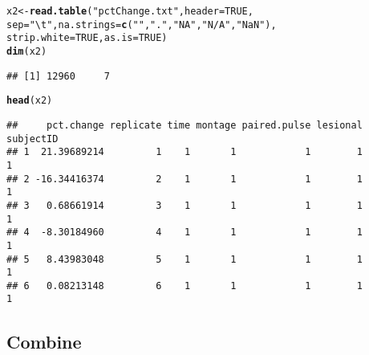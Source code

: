 \documentclass[11pt]{article}\usepackage[]{graphicx}\usepackage[]{color}
\makeatletter
\newcommand{\hlnum}[1]{\textcolor[rgb]{0.686,0.059,0.569}{#1}}%
\newcommand{\hlstr}[1]{\textcolor[rgb]{0.192,0.494,0.8}{#1}}%
\newcommand{\hlstd}[1]{\textcolor[rgb]{0.345,0.345,0.345}{#1}}%
\newcommand{\hlkwb}[1]{\textcolor[rgb]{0.69,0.353,0.396}{#1}}%
\newcommand{\hlkwc}[1]{\textcolor[rgb]{0.333,0.667,0.333}{#1}}%
\newcommand{\hlkwd}[1]{\textcolor[rgb]{0.737,0.353,0.396}{\textbf{#1}}}%
\newenvironment{kframe}{%
 \def\at@end@of@kframe{}%
 \ifinner\ifhmode%
  \def\at@end@of@kframe{\end{minipage}}%
  \begin{minipage}{\columnwidth}%
 \fi\fi%
 \def\FrameCommand##1{\hskip\@totalleftmargin \hskip-\fboxsep
 \colorbox{shadecolor}{##1}\hskip-\fboxsep
     \hskip-\linewidth \hskip-\@totalleftmargin \hskip\columnwidth}%
 \MakeFramed {\advance\hsize-\width
   \@totalleftmargin\z@ \linewidth\hsize
   \@setminipage}}%
 {\par\unskip\endMakeFramed%
 \at@end@of@kframe}
\newenvironment{knitrout}{}{} %
\makeatother
\begin{document}
\begin{knitrout}
\color{fgcolor}\begin{kframe}
\begin{alltt}
\hlstd{x2}\hlkwb{<-}\hlkwd{read.table}\hlstd{(}\hlstr{"pctChange.txt"}\hlstd{,}\hlkwc{header}\hlstd{=}\hlnum{TRUE}\hlstd{,}
                \hlkwc{sep}\hlstd{=}\hlstr{"\textbackslash{}t"}\hlstd{,}\hlkwc{na.strings}\hlstd{=}\hlkwd{c}\hlstd{(}\hlstr{""}\hlstd{,}\hlstr{"."}\hlstd{,}\hlstr{"NA"}\hlstd{,}\hlstr{"N/A"}\hlstd{,}\hlstr{"NaN"}\hlstd{),}
                \hlkwc{strip.white}\hlstd{=}\hlnum{TRUE}\hlstd{,}\hlkwc{as.is}\hlstd{=}\hlnum{TRUE}\hlstd{)}
\hlkwd{dim}\hlstd{(x2)}
\end{alltt}
\begin{verbatim}
## [1] 12960     7
\end{verbatim}
\begin{alltt}
\hlkwd{head}\hlstd{(x2)}
\end{alltt}
\begin{verbatim}
##     pct.change replicate time montage paired.pulse lesional subjectID
## 1  21.39689214         1    1       1            1        1         1
## 2 -16.34416374         2    1       1            1        1         1
## 3   0.68661914         3    1       1            1        1         1
## 4  -8.30184960         4    1       1            1        1         1
## 5   8.43983048         5    1       1            1        1         1
## 6   0.08213148         6    1       1            1        1         1
\end{verbatim}
\end{kframe}
\end{knitrout}

\subsection{Combine}
\end{document}
